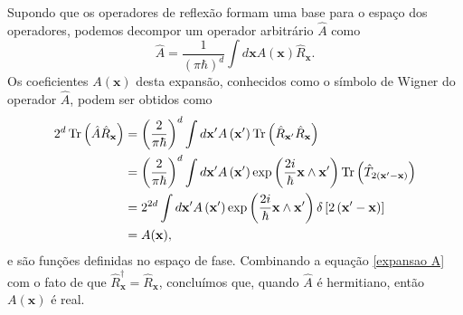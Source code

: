 \documentclass[
	12pt,
	oneside,			%
	a4paper,			%
	english,			%
	brazil				%
	]{abntex2}
\theoremstyle{definition}
\begin{document}
Supondo que os operadores de reflexão formam uma base para o espaço dos operadores, podemos decompor um operador arbitrário $\hat{A}$ como
\begin{equation}
\label{expansao A}
    \hat{A} = \frac{1}{\left(\pi \hbar\right)^d} \int d\mathbf{x} A(\mathbf{x}) \hat{R}_\mathbf{x}.
\end{equation}
Os coeficientes $A(\mathbf{x})$ desta expansão, conhecidos como o símbolo de Wigner do operador $\hat{A}$, podem ser obtidos como
\begin{equation}
    \begin{aligned}
        2^d \Tr \left( \hat{A} \hat{R}_\mathbf{x} \right) &= \left( \frac{2}{\pi \hbar} \right)^d \int d\mathbf{x}' A\left(\mathbf{x}'\right) \Tr \left(\hat{R}_{\mathbf{x}'}\hat{R}_\mathbf{x}\right) \\
        &=  \left( \frac{2}{\pi \hbar} \right)^d \int d\mathbf{x}' A\left(\mathbf{x}'\right) \exp \left( \frac{2i}{\hbar} \mathbf{x} \wedge \mathbf{x}' \right) \Tr \left(\hat{T}_{2(\mathbf{x}'-\mathbf{x})}\right) \\
        &=  2^{2d} \int d\mathbf{x}' A\left(\mathbf{x}'\right) \exp \left( \frac{2i}{\hbar} \mathbf{x} \wedge \mathbf{x}' \right)\delta\left[2\left(\mathbf{x}'-\mathbf{x}\right)\right] \\
        &= A(\mathbf{x}),
    \end{aligned}
\end{equation}
e são funções definidas no espaço de fase. Combinando a equação \eqref{expansao A} com o fato de que $\hat{R}_\mathbf{x}^\dagger = \hat{R}_\mathbf{x}$, concluímos que, quando $\hat{A}$ é hermitiano, então $A(\mathbf{x})$ é real.
\end{document}
